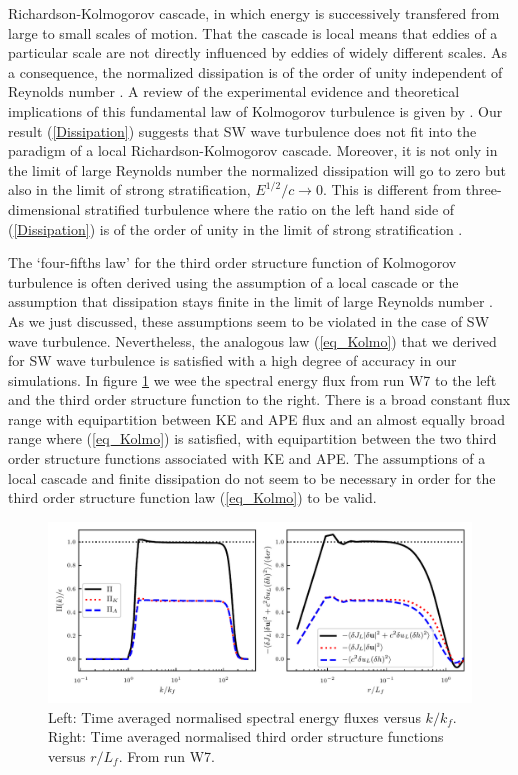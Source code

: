 Richardson-Kolmogorov cascade, in which energy is successively transfered from
large to small scales of motion. That the cascade is local means that eddies of
a particular scale are not directly influenced by eddies of widely different
scales. As a consequence, the normalized dissipation is of the order of unity
independent of Reynolds number \cite[]{Pope, TennekesLumley}. A review of the
experimental evidence and theoretical implications of this fundamental law of
Kolmogorov turbulence is given by \cite{Vassilicos2015}. Our result
(\ref{Dissipation}) suggests that SW wave turbulence does not fit into the
paradigm of a local Richardson-Kolmogorov cascade. Moreover, it is not only in
the limit of large Reynolds number the normalized dissipation will go to zero
but also in the limit of strong stratification, $ E^{1/2}/c \rightarrow 0 $.
This is different from three-dimensional stratified turbulence where the ratio
on the left hand side of (\ref{Dissipation}) is of the order of unity in the
limit of strong stratification \cite[]{Lindborg2006, Brethouwer2007}.


The `four-fifths law' for the third order structure function of Kolmogorov
turbulence is often derived using the assumption of a local cascade
\cite[]{Vassilicos2015} or the assumption that dissipation stays finite in the
limit of large Reynolds number \cite[]{Frisch}. As we just discussed, these
assumptions seem to be violated in the case of SW wave turbulence.
Nevertheless, the analogous law (\ref{eq_Kolmo}) that we derived for SW wave
turbulence is satisfied with a high degree of accuracy in our simulations. In
figure \ref{Flux} we wee the spectral energy flux from run W7 to the left and
the third order structure function to the right. There is a broad constant flux
range with equipartition between KE and APE flux and an almost equally broad
range where (\ref{eq_Kolmo}) is satisfied, with equipartition between the two
third order structure functions associated with KE and APE. The assumptions of
a local cascade and finite dissipation do not seem to be necessary in order for
the third order structure function law (\ref{eq_Kolmo}) to be valid.



\begin{figure}
\centerline{\includegraphics[width=5.8in]{../Pyfig/fig_flux_struct_combined}}
\caption{Left: Time averaged normalised spectral energy fluxes versus $ k/k_f
$. Right: Time averaged normalised third order structure functions versus $
r/L_f $. From run W7. }
\label{Flux}
\end{figure}


